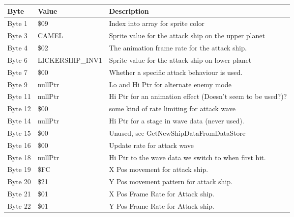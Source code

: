 \begin{figure}[H]
{\begin{adjustbox}{width=12cm}
\begin{tabular}{lll}
\toprule
 Byte    & Value                     & Description                                                        \\
\midrule
 Byte 1  & \$09                       & Index into array for sprite color                                  \\
 Byte 3  & CAMEL                     & Sprite value for the attack ship on the upper planet               \\
 Byte 4  & \$02                       & The animation frame rate for the attack ship.                      \\
 Byte 6  & LICKERSHIP\_INV1           & Sprite value for the attack ship on lower planet                   \\
 Byte 7  & \$00                       & Whether a specific attack behaviour is used.                       \\
 Byte 9  & nullPtr                   & Lo and Hi Ptr for alternate enemy mode                             \\
 Byte 11 & nullPtr                   & Hi Ptr for an animation effect (Doesn't seem to be used?)?         \\
 Byte 12 & \$00                       & some kind of rate limiting for attack wave                         \\
 Byte 14 & nullPtr                   & Hi Ptr for a stage in wave data (never used).                      \\
 Byte 15 & \$00                       & Unused, see GetNewShipDataFromDataStore                            \\
 Byte 16 & \$00                       & Update rate for attack wave                                        \\
 Byte 18 & nullPtr                   & Hi Ptr to the wave data we switch to when first hit.               \\
 Byte 19 & \$FC                       & X Pos movement for attack ship.                                    \\
 Byte 20 & \$21                       & Y Pos movement pattern for attack ship.                            \\
 Byte 21 & \$01                       & X Pos Frame Rate for Attack ship.                                  \\
 Byte 22 & \$01                       & Y Pos Frame Rate for Attack ship.                                  \\

\end{tabular}
\end{adjustbox}}
\end{figure}
